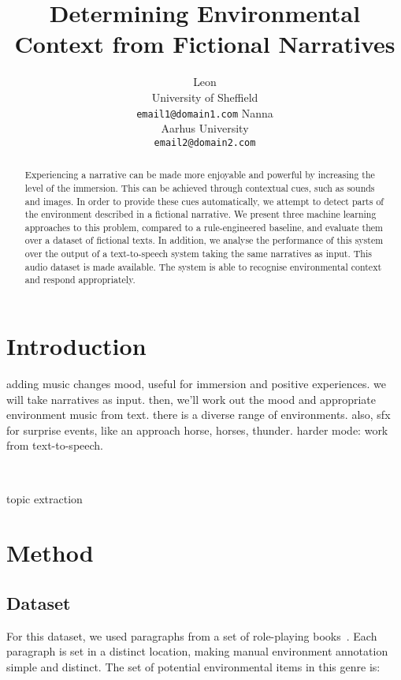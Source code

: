 \documentclass[11pt]{article}
\title{Determining Environmental Context from Fictional Narratives}
\author{Leon\\
  University of Sheffield\\
  {\tt email1@domain1.com}  \And
  Nanna\\
  Aarhus University\\
  {\tt  email2@domain2.com}}
\date{}
\begin{document}
\maketitle
\begin{abstract}
Experiencing a narrative can be made more enjoyable and powerful by increasing the level of the immersion.
This can be achieved through contextual cues, such as sounds and images.
In order to provide these cues automatically, we attempt to detect parts of the environment described in a fictional narrative.
We present three machine learning approaches to this problem, compared to a rule-engineered baseline, and evaluate them over a dataset of fictional texts.
In addition, we analyse the performance of this system over the output of a text-to-speech system taking the same narratives as input.
This audio dataset is made available.
The system is able to recognise environmental context and respond appropriately.
\end{abstract}


\section{Introduction}

adding music changes mood, useful for immersion and positive experiences.
we will take narratives as input.
then, we'll work out the mood and appropriate environment music from text.
there is a diverse range of environments.
also, sfx for surprise events, like an approach horse, horses, thunder.
harder mode: work from text-to-speech.


~\cite{madden2009collaborative}
~\cite{huiberts2010captivating}

topic extraction~\cite{allan2002introduction}

\section{Method}

\subsection{Dataset}
For this dataset, we used paragraphs from a set of role-playing books~\cite{fangs,crypt,poe,sswamp}.
Each paragraph is set in a distinct location, making manual environment annotation simple and distinct.
The set of potential environmental items in this genre is:
\end{document}
